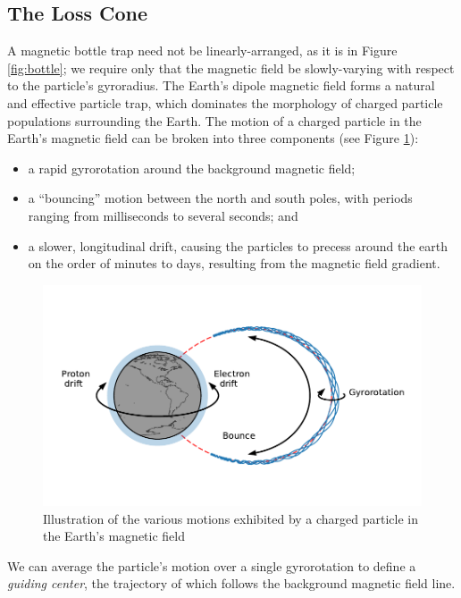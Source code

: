 \subsection{The Loss Cone}

A magnetic bottle trap need not be linearly-arranged, as it is in Figure \ref{fig:bottle}; we require only that the magnetic field be slowly-varying with respect to the particle's gyroradius. The Earth's dipole magnetic field forms a natural and effective particle trap, which dominates the morphology of charged particle populations surrounding the Earth. The motion of a charged particle in the Earth's magnetic field can be broken into three components (see Figure \ref{fig:adiabatic_motions}): 
\begin{itemize}
\item a rapid gyrorotation around the background magnetic field;
\item a ``bouncing'' motion between the north and south poles, with periods ranging from milliseconds to several seconds; and
\item a slower, longitudinal drift, causing the particles to precess around the earth on the order of minutes to days, resulting from the magnetic field gradient.
\end{itemize}

\begin{figure}[t]
\begin{center}
\includegraphics{figures/particle_motions.pdf}
\caption[Adiabatic motion in the Earth's magnetic field]{Illustration of the various motions exhibited by a charged particle in the Earth's magnetic field}
\label{fig:adiabatic_motions}
\end{center}
\end{figure}

\noindent We can average the particle's motion over a single gyrorotation to define a \emph{guiding center}, the trajectory of which follows the background magnetic field line. 

